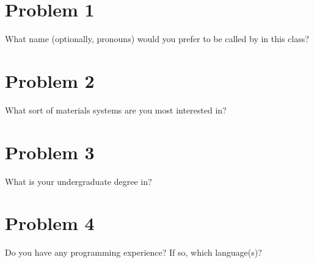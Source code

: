 
\DeclareSIUnit{}





\pagebreak

\section*{Problem 1}

What name (optionally, pronouns) would you prefer to be called by in this class?


\section*{Problem 2}

What sort of materials systems are you most interested in?


\section*{Problem 3}

What is your undergraduate degree in?


\pagebreak

\section*{Problem 4}

Do you have any programming experience? If so, which language(s)?


